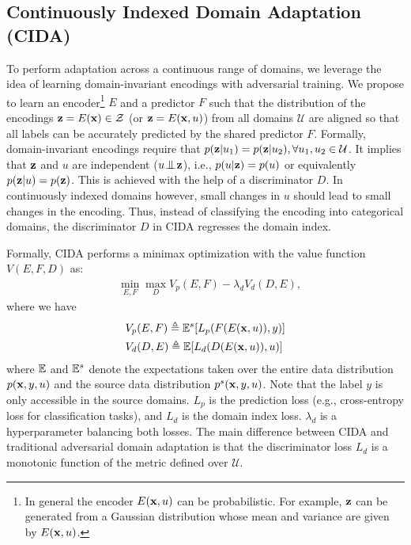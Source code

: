\documentclass{article}
\begin{document}
\subsection{Continuously Indexed Domain Adaptation (CIDA)}\label{sec:cida}
To perform adaptation across a continuous range of domains, we leverage the idea of learning domain-invariant encodings with adversarial training. We propose to learn an encoder\footnote{In general the encoder $E({\bf x},u)$ can be probabilistic. For example, ${\bf z}$ can be generated from a Gaussian distribution whose mean and variance are given by $E({\bf x},u)$.} $E$ and a predictor $F$ such that the distribution of the encodings ${\bf z} = E({\bf x}) \in {\mathcal Z}$ (or ${\bf z} = E({\bf x},u)$) from all domains $\mathcal{U}$ are aligned so that all labels can be accurately predicted by the shared predictor $F$. 
Formally, domain-invariant encodings require that $p({\bf z}|u_1)=p({\bf z}|u_2),\forall u_1,u_2\in{\mathcal U}$. It implies that ${\bf z}$ and $u$ are independent ($u {\;\bot\!\!\!\!\!\!\bot\;} {\bf z}$), i.e., $p(u | {\bf z}) = p(u)$ or equivalently $p({\bf z} | u) = p({\bf z})$. This is achieved with the help of a discriminator $D$. In continuously indexed domains however, small changes in $u$ should lead to small changes in the encoding. Thus, instead of classifying the encoding into categorical domains, the discriminator $D$ in CIDA regresses the domain index. 

Formally, CIDA performs a minimax optimization with the value function $V(E,F,D)$ as:
\begin{align}
&\min\limits_{E,F} \max\limits_D V_p(E,F) - \lambda_d V_d(D,E), \label{eq:full_game}
\end{align}
where we have
\begin{align}
& V_p(E,F) \triangleq {\mathbb E}^s [L_p(F(E({\bf x},u)),y)] \nonumber \\
& V_d(D,E) \triangleq {\mathbb E}[L_d( D(E({\bf x}, u)),u)] \nonumber
\end{align}
where ${\mathbb E}$ and ${\mathbb E}^s$ denote the expectations taken over the entire data distribution $p({\bf x},y,u)$ and the source data distribution $p^s({\bf x},y,u)$. Note that the label $y$ is only accessible in the source domains. $L_p$ is the prediction loss (e.g., cross-entropy loss for classification tasks), and $L_d$ is the domain index loss. $\lambda_d$ is a hyperparameter balancing both losses. The main difference between CIDA and traditional adversarial domain adaptation is that the discriminator loss $L_d$ is a monotonic function of the metric defined over $\mathcal{U}$. 
\end{document}
